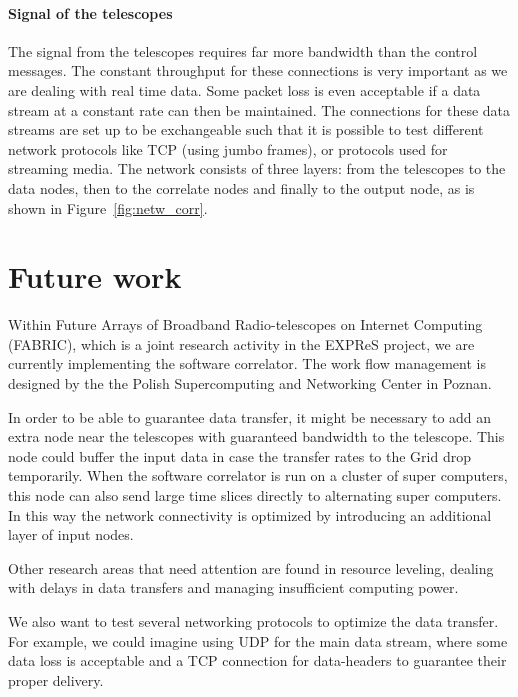 \documentclass[12pt]{article}
\begin{document}
\paragraph{Signal of the telescopes}
The signal from the telescopes requires far more bandwidth than the
control messages. The constant throughput for these connections is
very important as we are dealing with real time data. Some packet loss
is even acceptable if a data stream at a constant rate can then be
maintained. The connections for these data streams are set up to be
exchangeable such that it is possible to test different network
protocols like TCP (using jumbo frames), or protocols used for
streaming media. The network consists of three layers: from the
telescopes to the data nodes, then to the correlate nodes and finally
to the output node, as is shown in Figure~\ref{fig:netw_corr}.


\section{Future work}
Within Future Arrays of Broadband Radio-telescopes on Internet
Computing (FABRIC), which is a joint research activity in the EXPReS
project, we are currently implementing the software correlator. The
work flow management is designed by the the Polish Supercomputing and
Networking Center in Poznan.

In order to be able to guarantee data transfer, it might be necessary
to add an extra node near the telescopes with guaranteed bandwidth to
the telescope. This node could buffer the input data in case the
transfer rates to the Grid drop temporarily. When the software
correlator is run on a cluster of super computers, this node can also
send large time slices directly to alternating super computers. In
this way the network connectivity is optimized by introducing an
additional layer of input nodes.

Other research areas that need attention are found in resource
leveling, dealing with delays in data transfers and managing
insufficient computing power.

We also want to test several networking protocols to optimize the data
transfer. For example, we could imagine using UDP for the main data
stream, where some data loss is acceptable and a TCP connection for
data-headers to guarantee their proper delivery.
%
%


%
%

\end{document}
